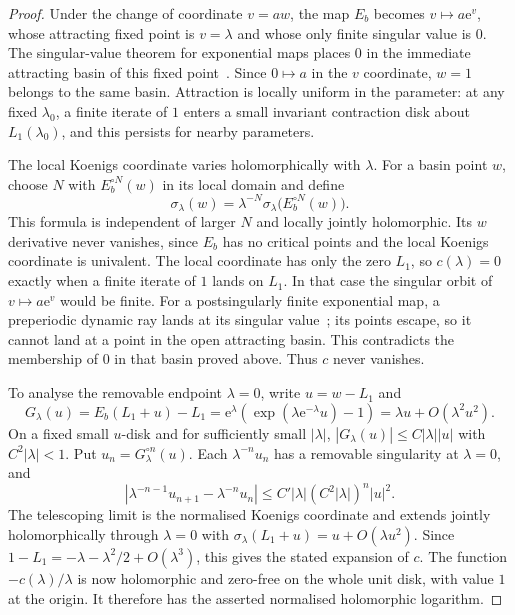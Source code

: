 \documentclass[11pt]{amsart}
\theoremstyle{definition}
\newcommand{\eee}{\mathrm{e}}
\begin{document}
\begin{proof}
Under the change of coordinate $v=aw$, the map $E_b$ becomes
$v\mapsto a\eee^v$, whose attracting fixed point is $v=\lambda$ and
whose only finite singular value is $0$.  The singular-value theorem
for exponential maps places $0$ in the immediate attracting basin
of this fixed point~\cite[\S2]{Schleicher2003}.  Since $0\mapsto a$
in the $v$ coordinate, $w=1$ belongs to the same basin.
Attraction is locally uniform in the parameter: at any fixed
$\lambda_0$, a finite iterate of $1$ enters a small invariant
contraction disk about $L_1(\lambda_0)$, and this persists for nearby
parameters.

The local Koenigs coordinate varies holomorphically with $\lambda$.
For a basin point $w$, choose $N$ with $E_b^{\circ N}(w)$ in its local
domain and define
\[
 \sigma_\lambda(w)=\lambda^{-N}
       \sigma_\lambda\bigl(E_b^{\circ N}(w)\bigr).
\]
This formula is independent of larger $N$ and locally jointly
holomorphic.  Its $w$ derivative never vanishes, since $E_b$ has no
critical points and the local Koenigs coordinate is univalent.
The local coordinate has only the zero $L_1$, so $c(\lambda)=0$
exactly when a finite iterate of $1$ lands on $L_1$.  In that case
the singular orbit of $v\mapsto a\eee^v$ would be finite.
For a postsingularly finite exponential map, a preperiodic dynamic
ray lands at its singular value~\cite[Thm.~3.1]{LaubnerSchleicherVicol2008};
its points escape, so it cannot land at a point in the open attracting
basin.  This contradicts the membership of $0$ in that basin proved above.
Thus $c$ never vanishes.

To analyse the removable endpoint $\lambda=0$, write $u=w-L_1$ and
\[
 G_\lambda(u)=E_b(L_1+u)-L_1
   =\eee^\lambda(\exp(\lambda\eee^{-\lambda}u)-1)
   =\lambda u+O(\lambda^2u^2).
\]
On a fixed small $u$-disk and for sufficiently small $|\lambda|$,
$|G_\lambda(u)|\le C|\lambda||u|$ with $C^2|\lambda|<1$.
Put $u_n=G_\lambda^{\circ n}(u)$.  Each
$\lambda^{-n}u_n$ has a removable singularity at $\lambda=0$, and
\[
 \left|\lambda^{-n-1}u_{n+1}-\lambda^{-n}u_n\right|
 \le C'|\lambda|(C^2|\lambda|)^n|u|^2.
\]
The telescoping limit is the normalised Koenigs coordinate and extends
jointly holomorphically through $\lambda=0$ with
$\sigma_\lambda(L_1+u)=u+O(\lambda u^2)$.
Since $1-L_1=-\lambda-\lambda^2/2+O(\lambda^3)$, this gives the
stated expansion of $c$.  The function $-c(\lambda)/\lambda$ is now
holomorphic and zero-free on the whole unit disk, with value $1$ at the
origin.  It therefore has the asserted normalised holomorphic logarithm.


\end{proof}
\end{document}
